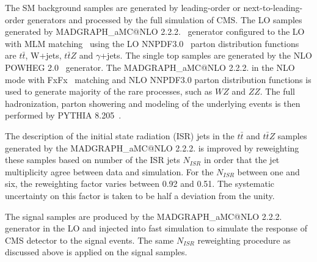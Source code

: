 The SM background samples are generated by leading-order or next-to-leading-order generators and processed by the full simulation of CMS. The LO samples generated by MADGRAPH\_aMC@NLO 2.2.2.~\cite{Alwall:2014hca} generator configured to the LO with MLM matching~\cite{Alwall:2007fs} using the LO NNPDF3.0~\cite{Ball:2014uwa} parton distribution functions are  $t\bar{t}$, W+jets, $t\bar{t}Z$ and $\gamma$+jets. The single top samples are generated by the NLO POWHEG 2.0~\cite{Alioli:2010xd} generator. The MADGRAPH\_aMC@NLO 2.2.2. in the NLO mode with FxFx~\cite{Frederix:2012ps} matching and NLO NNPDF3.0 parton distribution functions is used to generate majority of the rare processes, such as $WZ$ and $ZZ$. The full hadronization, parton showering and modeling of the underlying events is then performed by PYTHIA 8.205~\cite{Sjostrand:2014zea}.

The description of the initial state radiation (ISR) jets in the $t\bar{t}$ and $t\bar{t}Z$ samples generated by the MADGRAPH\_aMC@NLO 2.2.2. is improved by reweighting these samples based on number of the ISR jets $N_{ISR}$ in order that the jet multiplicity agree between data and simulation. For the $N_{ISR}$ between one and six, the reweighting factor varies between 0.92 and 0.51. The systematic uncertainty on this factor is taken to be half a deviation from the unity.

The signal samples are produced by the MADGRAPH\_aMC@NLO 2.2.2. generator in the LO and injected into fast simulation to simulate the response of CMS detector to the signal events.  The same $N_{ISR}$ reweighting procedure as discussed above is applied on the signal samples. 

